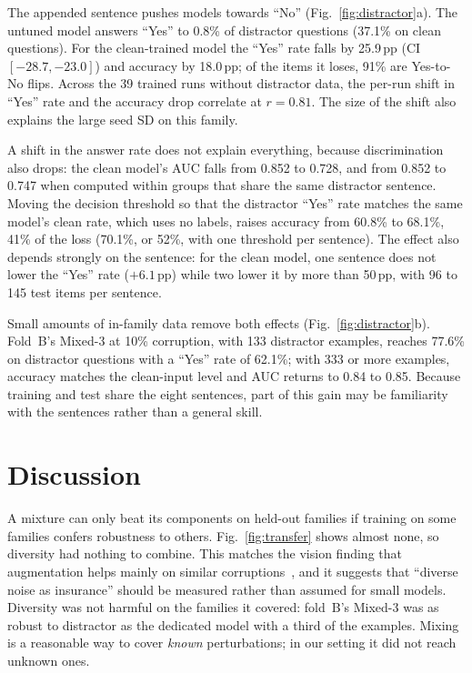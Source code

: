 \documentclass[conference]{IEEEtran}
\newcommand{\ppts}{\,pp}
\newcommand{\pfam}[1]{\textsf{#1}}
\begin{document}
The appended sentence pushes models towards ``No'' (Fig.~\ref{fig:distractor}a). The untuned model answers ``Yes'' to 0.8\% of distractor questions (37.1\% on clean questions). For the clean-trained model the ``Yes'' rate falls by 25.9\ppts{} (CI $[-28.7, -23.0]$) and accuracy by 18.0\ppts{}; of the items it loses, 91\% are Yes-to-No flips. Across the 39 trained runs without distractor data, the per-run shift in ``Yes'' rate and the accuracy drop correlate at $r = 0.81$. The size of the shift also explains the large seed SD on this family.

A shift in the answer rate does not explain everything, because discrimination also drops: the clean model's AUC falls from 0.852 to 0.728, and from 0.852 to 0.747 when computed within groups that share the same distractor sentence. Moving the decision threshold so that the distractor ``Yes'' rate matches the same model's clean rate, which uses no labels, raises accuracy from 60.8\% to 68.1\%, 41\% of the loss (70.1\%, or 52\%, with one threshold per sentence). The effect also depends strongly on the sentence: for the clean model, one sentence does not lower the ``Yes'' rate ($+6.1$\ppts{}) while two lower it by more than 50\ppts{}, with 96 to 145 test items per sentence.

Small amounts of in-family data remove both effects (Fig.~\ref{fig:distractor}b). Fold~B's Mixed-3 at 10\% corruption, with 133 distractor examples, reaches 77.6\% on distractor questions with a ``Yes'' rate of 62.1\%; with 333 or more examples, accuracy matches the clean-input level and AUC returns to 0.84 to 0.85. Because training and test share the eight sentences, part of this gain may be familiarity with the sentences rather than a general skill.

\section{Discussion}
\label{sec:discussion}

A mixture can only beat its components on held-out families if training on some families confers robustness to others. Fig.~\ref{fig:transfer} shows almost none, so diversity had nothing to combine. This matches the vision finding that augmentation helps mainly on similar corruptions~\cite{mintun2021interaction,kang2019transfer}, and it suggests that ``diverse noise as insurance'' should be measured rather than assumed for small models. Diversity was not harmful on the families it covered: fold~B's Mixed-3 was as robust to \pfam{distractor} as the dedicated model with a third of the examples. Mixing is a reasonable way to cover \emph{known} perturbations; in our setting it did not reach unknown ones.
\end{document}
